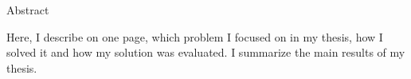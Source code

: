 \begin{center} 
\huge Abstract
\end{center}

Here, I describe on one page, which problem I focused on in my thesis, how I solved it and how my solution was evaluated. I summarize the main results of my thesis.

